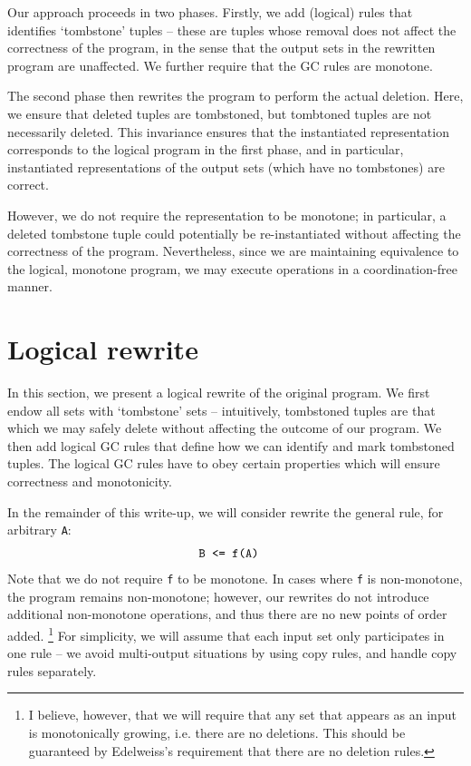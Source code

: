 \documentclass[10pt]{proc}
\renewcommand{\tt}[1]{\ifmmode\text{\texttt{#1}}\else\texttt{#1}\fi}
\begin{document}
Our approach proceeds in two phases.
Firstly, we add (logical) rules that identifies `tombstone' tuples -- these are tuples whose removal does not affect the correctness of the program, in the sense that the output sets in the rewritten program are unaffected.
We further require that the GC rules are monotone.

The second phase then rewrites the program to perform the actual deletion.
Here, we ensure that deleted tuples are tombstoned, but tombtoned tuples are not necessarily deleted.
This invariance ensures that the instantiated representation corresponds to the logical program in the first phase, and in particular, instantiated representations of the output sets (which have no tombstones) are correct.

However, we do not require the representation to be monotone; in particular, a deleted tombstone tuple could potentially be re-instantiated without affecting the correctness of the program.
Nevertheless, since we are maintaining equivalence to the logical, monotone program, we may execute operations in a coordination-free manner.

\section{Logical rewrite}
In this section, we present a logical rewrite of the original program.
We first endow all sets with `tombstone' sets -- intuitively, tombstoned tuples are that which we may safely delete without affecting the outcome of our program.
We then add logical GC rules that define how we can identify and mark tombstoned tuples.
The logical GC rules have to obey certain properties which will ensure correctness and monotonicity.

In the remainder of this write-up, we will consider rewrite the general rule, for arbitrary \tt{A}:
\begin{align}
\tt{B} &\tt{ <= f(A)}
\end{align}
Note that we do not require \tt{f} to be monotone.
In cases where \tt{f} is non-monotone, the program remains non-monotone; however, our rewrites do not introduce additional non-monotone operations, and thus there are no new points of order added.
\footnote{I believe, however, that we will require that any set that appears as an input is monotonically growing, i.e. there are no deletions. This should be guaranteed by Edelweiss's requirement that there are no deletion rules.}
For simplicity, we will assume that each input set only participates in one rule -- we avoid multi-output situations by using copy rules, and handle copy rules separately.
\end{document}

